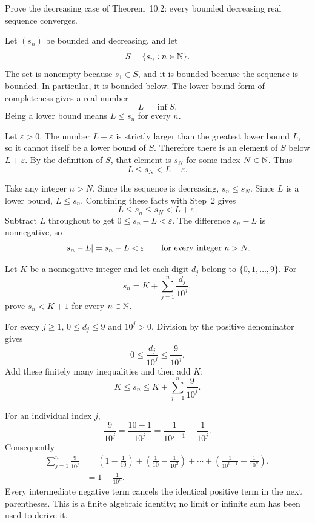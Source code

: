 \goal Prove the decreasing case of Theorem~10.2: every bounded
decreasing real sequence converges.

Let $(s_n)$ be bounded and decreasing, and let
\[
 S=\{s_n:n\in\mathbb{N}\}.
\]
The set is nonempty because $s_1\in S$, and it is bounded because
the sequence is bounded. In particular, it is bounded below.
The lower-bound form of completeness gives a real number
\[
 L=\inf S.
\]
Being a lower bound means $L\le s_n$ for every $n$.

Let $\varepsilon>0$. The number $L+\varepsilon$ is strictly larger
than the greatest lower bound $L$, so it cannot itself be a lower
bound of $S$. Therefore there is an element of $S$ below
$L+\varepsilon$. By the definition of $S$, that element is $s_N$
for some index $N\in\mathbb{N}$. Thus
\[
 L\le s_N<L+\varepsilon.
\]

Take any integer $n>N$. Since the sequence is decreasing,
$s_n\le s_N$. Since $L$ is a lower bound, $L\le s_n$.
Combining these facts with Step~2 gives
\[
 L\le s_n\le s_N<L+\varepsilon.
\]
Subtract $L$ throughout to get $0\le s_n-L<\varepsilon$.
The difference $s_n-L$ is nonnegative, so
\[
 \left|s_n-L\right|=s_n-L<\varepsilon
 \qquad\text{for every integer }n>N.
\]



\goal Let $K$ be a nonnegative integer and let each digit $d_j$ belong
to $\{0,1,\ldots,9\}$. For
\[
 s_n=K+\sum_{j=1}^{n}\frac{d_j}{10^j},
\]
prove $s_n<K+1$ for every $n\in\mathbb{N}$.

For every $j\ge1$, $0\le d_j\le9$ and $10^j>0$. Division by the
positive denominator gives
\[
 0\le\frac{d_j}{10^j}\le\frac9{10^j}.
\]
Add these finitely many inequalities and then add $K$:
\[
 K\le s_n\le K+\sum_{j=1}^{n}\frac9{10^j}.
\]

For an individual index $j$,
\[
 \frac9{10^j}=\frac{10-1}{10^j}
   =\frac1{10^{j-1}}-\frac1{10^j}.
\]
Consequently
\begin{align*}
 \sum_{j=1}^{n}\frac9{10^j}
   &=\left(1-\frac1{10}\right)
     +\left(\frac1{10}-\frac1{10^2}\right)
     +\cdots
     +\left(\frac1{10^{n-1}}-\frac1{10^n}\right),\\
   &=1-\frac1{10^n}.
\end{align*}
Every intermediate negative term cancels the identical positive term
in the next parentheses. This is a finite algebraic identity; no
limit or infinite sum has been used to derive it.

